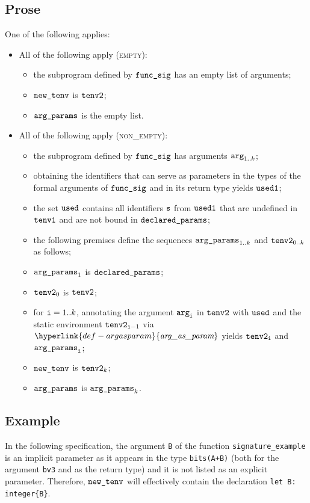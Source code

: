 \documentclass{book}
\newcommand\ProseOrTypeError[0]{\ProseTerminateAs{\TypeErrorConfig}}
\newcommand\argasparam[0]{\hyperlink{def-argasparam}{\textfunc{arg\_as\_param}}}
\begin{document}
\subsection{Prose}
One of the following applies:
\begin{itemize}
  \item All of the following apply (\textsc{empty}):
  \begin{itemize}
    \item the subprogram defined by $\texttt{func\_sig}$ has an empty list of arguments;
    \item $\texttt{new\_tenv}$ is $\texttt{tenv2}$;
    \item $\texttt{arg\_params}$ is the empty list.
  \end{itemize}

  \item All of the following apply (\textsc{non\_empty}):
  \begin{itemize}
    \item the subprogram defined by $\texttt{func\_sig}$ has arguments $\texttt{arg}_{1..k}$;
    \item obtaining the identifiers that can serve as parameters in the types of the formal arguments of $\texttt{func\_sig}$
          and in its return type yields $\texttt{used1}$;
    \item the set $\texttt{used}$ contains all identifiers $\texttt{s}$ from $\texttt{used1}$ that are undefined in $\texttt{tenv1}$ and are not
          bound in $\texttt{declared\_params}$;
    \item the following premises define the sequences $\texttt{arg\_params}_{1..k}$ and $\texttt{tenv2}_{0..k}$ as follows;
    \item $\texttt{arg\_params}_1$ is $\texttt{declared\_params}$;
    \item $\texttt{tenv2}_0$ is $\texttt{tenv2}$;
    \item for $\texttt{i}=1..k$, annotating the argument $\texttt{arg}_{\texttt{i}}$ in $\texttt{tenv2}$ with $\texttt{used}$ and the static environment $\texttt{tenv2}_{\texttt{i}-1}$
          via $\argasparam$ yields $\texttt{tenv2}_{\texttt{i}}$ and $\texttt{arg\_params}_{\texttt{i}}$\ProseOrTypeError;
    \item $\texttt{new\_tenv}$ is $\texttt{tenv2}_k$;
    \item $\texttt{arg\_params}$ is $\texttt{arg\_params}_k$.
  \end{itemize}
\end{itemize}

\subsection{Example}
In the following specification, the argument \texttt{B}
of the function \texttt{signature\_example} is an implicit parameter
as it appears in the type \texttt{bits(A+B)}
(both for the argument \texttt{bv3} and as the return type)
and it is not listed as an explicit parameter.
Therefore, $\texttt{new\_tenv}$ will effectively contain the declaration \verb|let B: integer{B}|.
\end{document}
